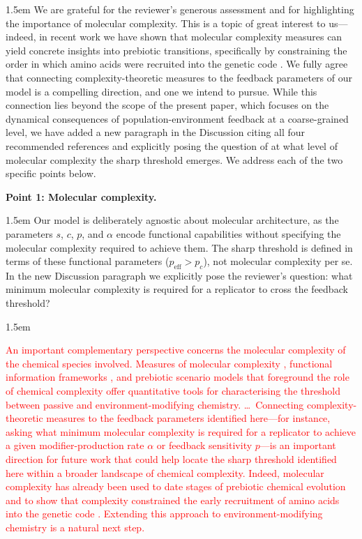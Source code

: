 \documentclass[11pt]{article}
\newcommand{\rev}[1]{\textcolor{red}{#1}}
\newenvironment{response}{\medskip\begin{adjustwidth}{1.5em}{}\color{blue}\mdseries\sloppy}{\end{adjustwidth}\color{black}}
\newenvironment{manuscript}{%
  \begin{adjustwidth}{1.5em}{}%
  \begin{mdframed}[
    topline=false, bottomline=false, rightline=false,
    linewidth=2pt, linecolor=red,
    innerleftmargin=1em, innerrightmargin=0pt,
    innertopmargin=0.4em, innerbottommargin=0.4em,
    skipabove=\medskipamount, skipbelow=\medskipamount
  ]\color{black}%
}{%
  \end{mdframed}%
  \end{adjustwidth}%
}
\begin{document}
\begin{response}
We are grateful for the reviewer's generous assessment and for highlighting the importance of molecular complexity. This is a topic of great interest to us---indeed, in recent work we have shown that molecular complexity measures can yield concrete insights into prebiotic transitions, specifically by constraining the order in which amino acids were recruited into the genetic code \citep{Hashmi2026Complexity}. We fully agree that connecting complexity-theoretic measures to the feedback parameters of our model is a compelling direction, and one we intend to pursue. While this connection lies beyond the scope of the present paper, which focuses on the dynamical consequences of population-environment feedback at a coarse-grained level, we have added a new paragraph in the Discussion citing all four recommended references and explicitly posing the question of at what level of molecular complexity the sharp threshold emerges. We address each of the two specific points below.
\end{response}

\noindent\textbf{Point 1: Molecular complexity.}

\begin{response}
Our model is deliberately agnostic about molecular architecture, as the parameters $s$, $c$, $p$, and $\alpha$ encode functional capabilities without specifying the molecular complexity required to achieve them. The sharp threshold is defined in terms of these functional parameters ($p_{\text{eff}} > p_c$), not molecular complexity per se. In the new Discussion paragraph we explicitly pose the reviewer's question: what minimum molecular complexity is required for a replicator to cross the feedback threshold?
\end{response}

\begin{manuscript}\rev{An important complementary perspective concerns the molecular complexity of the chemical species involved. Measures of molecular complexity \citep{Papentin1982Complexity,Bottcher2018Complexity,Bywater2012Dating,Bywater2018AminoAcids}, functional information frameworks \citep{Hazen2007Functional,Walker2013Algorithmic}, and prebiotic scenario models that foreground the role of chemical complexity \citep{Bywater2005Beach,Bywater2009Membrane} offer quantitative tools for characterising the threshold between passive and environment-modifying chemistry. \ldots\ Connecting complexity-theoretic measures to the feedback parameters identified here---for instance, asking what minimum molecular complexity is required for a replicator to achieve a given modifier-production rate $\alpha$ or feedback sensitivity $p$---is an important direction for future work that could help locate the sharp threshold identified here within a broader landscape of chemical complexity. Indeed, molecular complexity has already been used to date stages of prebiotic chemical evolution \citep{Bywater2012Dating} and to show that complexity constrained the early recruitment of amino acids into the genetic code \citep{Bywater2018AminoAcids,Hashmi2026Complexity}. Extending this approach to environment-modifying chemistry is a natural next step.}
\end{manuscript}
\end{document}
